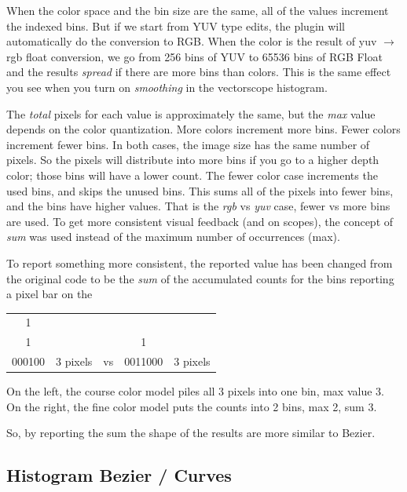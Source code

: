 When the color space and the bin size are the same, all of the values increment the indexed bins. But if we start from YUV type edits, the plugin will automatically do the conversion to RGB. When the color is the result of yuv $\rightarrow$ rgb float conversion, we go from 256 bins of YUV to 65536 bins of RGB Float and the results \textit{spread} if there are more bins than colors.  This is the same effect you see when you turn on \textit{smoothing} in the vectorscope histogram.

The \textit{total} pixels for each value is approximately the same, but the \textit{max} value depends on the color quantization.  More colors increment more bins.  Fewer colors increment fewer bins.  In both cases, the image size has the same number of pixels. So the pixels will distribute into more bins if you go to a higher depth color; those bins will have a lower count.  The fewer color case increments the used bins, and skips the unused bins.  This sums all of the pixels into fewer bins, and the bins have higher values. That is the \textit{rgb} vs \textit{yuv} case, fewer vs more bins are used. To get more consistent visual feedback (and on scopes), the concept of \textit{sum} was used instead of the maximum number of occurrences (max).

To report something more consistent, the reported value has been changed from the original code to be the \textit{sum} of the accumulated counts for the bins reporting a pixel bar on the

\begin{center}
	\begin{tabular}{clccr}
		\hline
		1 &  & & & \\
		1 &  & & 1 & \\
		000100 & 3 pixels & vs & 0011000& 3 pixels \\
		\hline
	\end{tabular}
\end{center}

On the left, the course color model piles all 3 pixels into one bin, max
value 3.
On the right, the fine color model puts the counts into 2 bins, max 2, sum 3.

So, by reporting the sum the shape of the results are more similar to Bezier.

\subsection{Histogram Bezier / Curves}%
\label{sub:histogram_bezier_curves}

